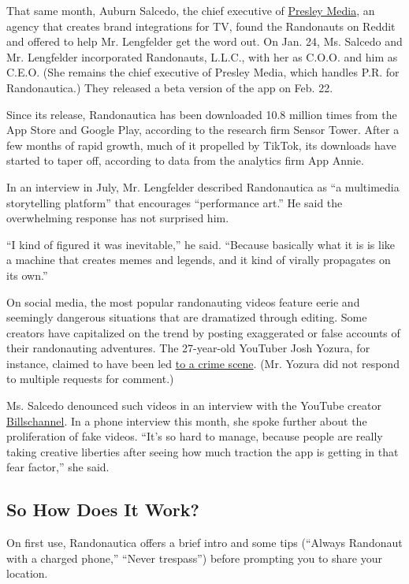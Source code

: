 That same month, Auburn Salcedo, the chief executive of
\href{https://www.presleymedia.com/}{Presley Media}, an agency that
creates brand integrations for TV, found the Randonauts on Reddit and
offered to help Mr. Lengfelder get the word out. On Jan. 24, Ms. Salcedo
and Mr. Lengfelder incorporated Randonauts, L.L.C., with her as C.O.O.
and him as C.E.O. (She remains the chief executive of Presley Media,
which handles P.R. for Randonautica.) They released a beta version of
the app on Feb. 22.

Since its release, Randonautica has been downloaded 10.8 million times
from the App Store and Google Play, according to the research firm
Sensor Tower. After a few months of rapid growth, much of it propelled
by TikTok, its downloads have started to taper off, according to data
from the analytics firm App Annie.

In an interview in July, Mr. Lengfelder described Randonautica as ``a
multimedia storytelling platform'' that encourages ``performance art.''
He said the overwhelming response has not surprised him.

``I kind of figured it was inevitable,'' he said. ``Because basically
what it is is like a machine that creates memes and legends, and it kind
of virally propagates on its own.''

On social media, the most popular randonauting videos feature eerie and
seemingly dangerous situations that are dramatized through editing. Some
creators have capitalized on the trend by posting exaggerated or false
accounts of their randonauting adventures. The 27-year-old YouTuber Josh
Yozura, for instance, claimed to have been led
\href{https://www.youtube.com/watch?v=Zdw_ykwq9Pg}{to a crime scene}.
(Mr. Yozura did not respond to multiple requests for comment.)

Ms. Salcedo denounced such videos in an interview with the YouTube
creator
\href{https://www.youtube.com/watch?v=z43KYpejDNQ}{Billschannel}. In a
phone interview this month, she spoke further about the proliferation of
fake videos. ``It's so hard to manage, because people are really taking
creative liberties after seeing how much traction the app is getting in
that fear factor,'' she said.

\hypertarget{so-how-does-it-work}{%
\subsection{So How Does It Work?}\label{so-how-does-it-work}}

On first use, Randonautica offers a brief intro and some tips (``Always
Randonaut with a charged phone,'' ``Never trespass'') before prompting
you to share your location.

